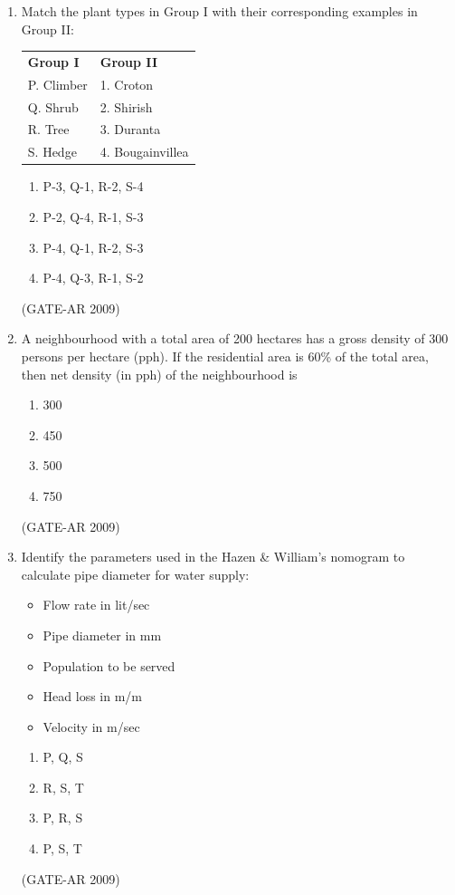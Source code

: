 \documentclass[a4paper,10pt]{article}
\begin{document}
\begin{enumerate}
	\item Match the plant types in Group I with their corresponding examples in Group II:  \\
    \begin{tabular}{ l l }
	\textbf{Group I} & \textbf{Group II} \\
	P. Climber & 1. Croton \\
	Q. Shrub & 2. Shirish \\
	R. Tree & 3. Duranta \\
	S. Hedge & 4. Bougainvillea \\
	\end{tabular}
	\begin{multicols}{2}
	\begin{enumerate}
        \item P-3, Q-1, R-2, S-4
        \item P-2, Q-4, R-1, S-3
        \item P-4, Q-1, R-2, S-3
        \item P-4, Q-3, R-1, S-2
    \end{enumerate}
	\end{multicols}
    \hfill (GATE-AR 2009)

    \item A neighbourhood with a total area of 200 hectares has a gross density of 300 persons per hectare (pph). If the residential area is 60\% of the total area, then net density (in pph) of the neighbourhood is 
    \begin{multicols}{4}
	\begin{enumerate}
        \item 300
        \item 450
        \item 500
        \item 750
    \end{enumerate}
	\end{multicols}
    \hfill (GATE-AR 2009)

    \item Identify the parameters used in the Hazen \& William’s nomogram to calculate pipe diameter for water supply: 
    \begin{itemize}
        \item Flow rate in lit/sec
        \item Pipe diameter in mm
        \item Population to be served
        \item Head loss in m/m
        \item Velocity in m/sec
    \end{itemize}
    \begin{multicols}{4}
	\begin{enumerate}
        \item P, Q, S
        \item R, S, T
        \item P, R, S
        \item P, S, T
    \end{enumerate}
	\end{multicols}
    \hfill (GATE-AR 2009)


\end{enumerate}
\end{document}
